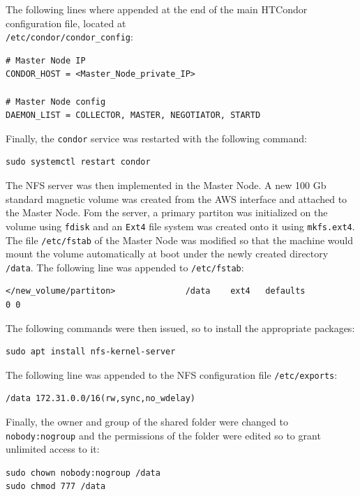 \documentclass{article}
\begin{document}
The following lines where appended at the end of the main HTCondor configuration file, located at\\
\texttt{/etc/condor/condor\_config}:

\begin{lstlisting}
# Master Node IP
CONDOR_HOST = <Master_Node_private_IP>

# Master Node config 
DAEMON_LIST = COLLECTOR, MASTER, NEGOTIATOR, STARTD
\end{lstlisting}

Finally, the \texttt{condor} service was restarted with the following command:

\begin{lstlisting}
sudo systemctl restart condor
\end{lstlisting}

The NFS server was then implemented in the Master Node.
A new 100 Gb standard magnetic volume was created from the AWS interface and attached to the Master Node.
Fom the server, a primary partiton was initialized on the volume using \texttt{fdisk} and an \texttt{Ext4} file system was created onto it using \texttt{mkfs.ext4}.
The file \texttt{/etc/fstab} of the Master Node was modified so that the machine would mount the volume automatically at boot under the newly created directory \texttt{/data}.
The following line was appended to \texttt{/etc/fstab}:

\begin{lstlisting}
</new_volume/partiton>              /data    ext4   defaults                0 0
\end{lstlisting}

The following commands were then issued, so to install the appropriate packages:

\begin{lstlisting}
sudo apt install nfs-kernel-server
\end{lstlisting}

The following line was appended to the NFS configuration file \texttt{/etc/exports}:

\begin{lstlisting}
/data 172.31.0.0/16(rw,sync,no_wdelay)
\end{lstlisting}

Finally, the owner and group of the shared folder were changed to \texttt{nobody:nogroup} and the permissions of the folder were edited so to grant unlimited access to it:

\begin{lstlisting}
sudo chown nobody:nogroup /data
sudo chmod 777 /data
\end{lstlisting}
\end{document}
